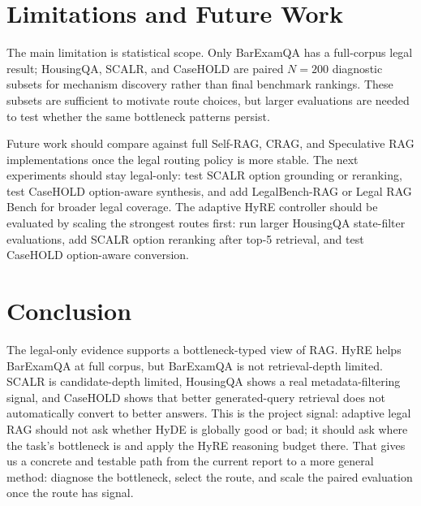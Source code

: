 \documentclass{article}
\newcommand{\hyre}{HyRE}
\begin{document}
\section{Limitations and Future Work}

The main limitation is statistical scope. Only BarExamQA has a full-corpus
legal result; HousingQA, SCALR, and CaseHOLD are paired $N=200$ diagnostic
subsets for mechanism discovery rather than final benchmark rankings. These
subsets are sufficient to motivate route choices, but larger evaluations are
needed to test whether the same bottleneck patterns persist.

Future work should compare against full Self-RAG, CRAG, and Speculative RAG
implementations once the legal routing policy is more stable. The next
experiments should stay legal-only: test SCALR option grounding or reranking,
test CaseHOLD option-aware synthesis, and add LegalBench-RAG or Legal RAG
Bench for broader legal coverage.
The adaptive \hyre{} controller should be evaluated by scaling the strongest
routes first: run larger HousingQA state-filter evaluations, add SCALR option
reranking after top-5 retrieval, and test CaseHOLD option-aware conversion.

\section{Conclusion}

The legal-only evidence supports a bottleneck-typed view of RAG. \hyre{}
helps BarExamQA at full corpus, but BarExamQA is not retrieval-depth limited.
SCALR is candidate-depth limited, HousingQA shows a real metadata-filtering
signal, and CaseHOLD shows that better generated-query retrieval does not
automatically convert to better answers. This is the project signal: adaptive
legal RAG should not ask whether HyDE is globally good or bad; it should ask
where the task's bottleneck is and apply the \hyre{} reasoning budget there.
That gives us a concrete and testable path from the current report to a more
general method: diagnose the bottleneck, select the route, and scale the
paired evaluation once the route has signal.

\clearpage


\end{document}
